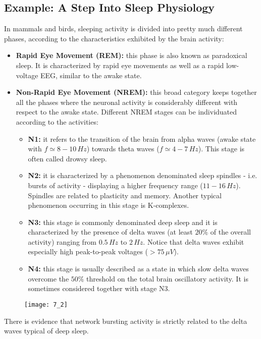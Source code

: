 \subsection{Example: A Step Into Sleep Physiology}
In mammals and birds, sleeping activity is divided into pretty much different
phases, according to the characteristics exhibited by the brain activity:
\begin{itemize}
    \item \textbf{Rapid Eye Movement (REM):} this phase is also known as paradoxical
          sleep. It is characterized by rapid eye movements as well as a rapid low-voltage EEG, similar to the awake state. 
    \item \textbf{Non-Rapid Eye Movement (NREM):} this broad category keeps together
          all the phases where the neuronal activity is considerably different with respect to the awake state. Different NREM stages can be individuated according to the activities:
          \begin{itemize}
              \item \textbf{N1:} it refers to the transition of the brain from alpha waves
                    (awake state with \(f\simeq8-10\,Hz\)) towards theta waves (\(f\simeq4-7\,Hz\)). This stage is often called drowsy sleep.
              \item \textbf{N2:} it is characterized by a phenomenon denominated sleep
                    spindles - i.e. bursts of activity - displaying a higher frequency range (\(11-16\,Hz\)). Spindles are related to plasticity and memory. Another typical phenomenon occurring in this stage is K-complexes. 
              \item \textbf{N3:} this stage is commonly denominated deep sleep and it is
                    characterized by the presence of delta waves (at least \(20\%\) of the
                    overall activity) ranging from \(0.5\,Hz\) to \(2\,Hz\). Notice that delta waves exhibit especially high peak-to-peak voltages (\(>75\,\mu{V}\)).
              \item \textbf{N4:} this stage is usually described as a state in which slow
                    delta waves overcome the \(50\%\) threshold on the total brain oscillatory
                    activity. It is sometimes considered together with stage N3.
          \end{itemize}
\end{itemize}
\begin{figure}[H]
    \texttt{[image: 7\_2]}
    \centering
\end{figure}
There is evidence that network bursting activity is strictly related to the delta
waves typical of deep sleep.
